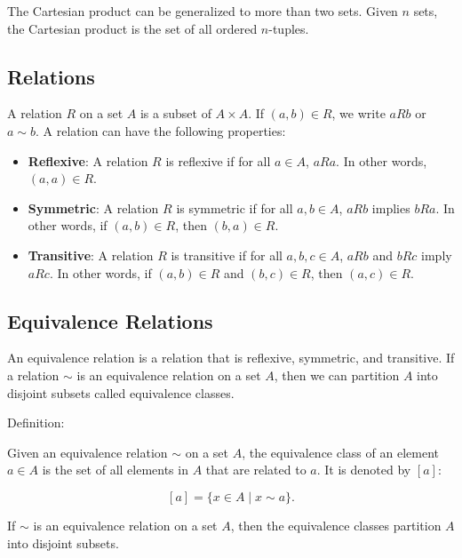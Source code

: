 The Cartesian product can be generalized to more than two sets. Given $n$ sets, the Cartesian product is the set of all ordered $n$-tuples.

\subsection{Relations}
A relation $R$ on a set $A$ is a subset of $A \times A$. If $(a, b) \in R$, we write $aRb$ or $a \sim b$. A relation can have the following properties:

\begin{itemize}
\item \textbf{Reflexive}: A relation $R$ is reflexive if for all $a \in A$, $aRa$. In other words, $(a, a) \in R$.
\item \textbf{Symmetric}: A relation $R$ is symmetric if for all $a, b \in A$, $aRb$ implies $bRa$. In other words, if $(a, b) \in R$, then $(b, a) \in R$.
\item \textbf{Transitive}: A relation $R$ is transitive if for all $a, b, c \in A$, $aRb$ and $bRc$ imply $aRc$. In other words, if $(a, b) \in R$ and $(b, c) \in R$, then $(a, c) \in R$.
\end{itemize}

\subsection{Equivalence Relations}
An equivalence relation is a relation that is reflexive, symmetric, and transitive. If a relation $\sim$ is an equivalence relation on a set $A$, then we can partition $A$ into disjoint subsets called equivalence classes.

Definition:

Given an equivalence relation $\sim$ on a set $A$, the equivalence class of an element $a \in A$ is the set of all elements in $A$ that are related to $a$. It is denoted by $[a]$:

\[
[a] = \{x \in A \mid x \sim a\}.
\]


\begin{theorem}
If $\sim$ is an equivalence relation on a set $A$, then the equivalence classes partition $A$ into disjoint subsets.
\end{theorem}


